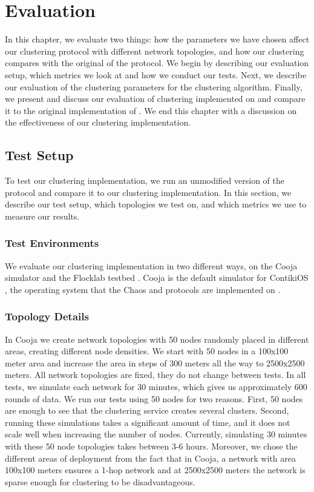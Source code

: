 \chapter{Evaluation}
\label{chap:evaluation}
In this chapter, we evaluate two things: how the parameters we have chosen affect our clustering protocol with different network topologies, and how our clustering compares with the original of the \atwo{} protocol. We begin by describing our evaluation setup, which metrics we look at and how we conduct our tests. Next, we describe our evaluation of the clustering parameters for the clustering algorithm. Finally, we present and discuss our evaluation of clustering implemented on \atwo{} and compare it to the original implementation of \atwo{}. We end this chapter with a discussion on the effectiveness of our clustering implementation.

\section{Test Setup}
To test our clustering implementation, we run an unmodified version of the \atwo{} protocol and compare it to our clustering implementation. In this section, we describe our test setup, which topologies we test on, and which metrics we use to measure our results. 


\subsection{Test Environments}
We evaluate our clustering implementation in two different ways, on the Cooja simulator \cite{Osterlind2006-cooja-introduction} and the Flocklab testbed \cite{Lim2013-flocklab-introduction}. Cooja is the default simulator for ContikiOS \cite{Dunkels2004-contiki-introduction}, the operating system that the Chaos and \atwo{} protocols are implemented on \cite{chaos-introduction-paper, a2-introduction-paper}.

\subsection{Topology Details}
\label{subsec:evaluation-topology-details}
In Cooja we create network topologies with 50 nodes randomly placed in different areas, creating different node densities. We start with 50 nodes in a 100x100 meter area and increase the area in steps of 300 meters all the way to 2500x2500 meters. All network topologies are fixed, they do not change between tests. In all tests, we simulate each network for 30 minutes, which gives us approximately 600 rounds of data. We run our tests using 50 nodes for two reasons. First, 50 nodes are enough to see that the clustering service creates several clusters. Second, running these simulations takes a significant amount of time, and it does not scale well when increasing the number of nodes. Currently, simulating 30 minutes with these 50 node topologies takes between 3-6 hours. Moreover, we chose the different areas of deployment from the fact that in Cooja, a network with area 100x100 meters ensures a 1-hop network and at 2500x2500 meters the network is sparse enough for clustering to be disadvantageous.

